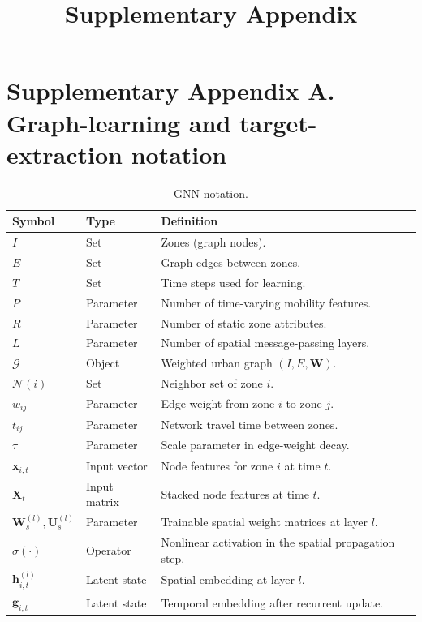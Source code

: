 \documentclass[11pt]{article}
\title{Supplementary Appendix}
\author{}
\date{}
\begin{document}
\maketitle

\section*{Supplementary Appendix A. Graph-learning and target-extraction notation}

\begin{table}[p]
\centering
\caption{GNN notation.}
\begin{threeparttable}
\scriptsize
\setlength{\tabcolsep}{3pt}
\renewcommand{\arraystretch}{0.97}
\begin{tabularx}{\textwidth}{Z Z Y}
\toprule
Symbol & Type & Definition \\
\midrule
$I$ & Set & Zones (graph nodes). \\
$E$ & Set & Graph edges between zones. \\
$T$ & Set & Time steps used for learning. \\
$P$ & Parameter & Number of time-varying mobility features. \\
$R$ & Parameter & Number of static zone attributes. \\
$L$ & Parameter & Number of spatial message-passing layers. \\
$\mathcal{G}$ & Object & Weighted urban graph $(I,E,\mathbf{W})$. \\
$\mathcal{N}(i)$ & Set & Neighbor set of zone $i$. \\
$w_{ij}$ & Parameter & Edge weight from zone $i$ to zone $j$. \\
$t_{ij}$ & Parameter & Network travel time between zones. \\
$\tau$ & Parameter & Scale parameter in edge-weight decay. \\
$\mathbf{x}_{i,t}$ & Input vector & Node features for zone $i$ at time $t$. \\
$\mathbf{X}_t$ & Input matrix & Stacked node features at time $t$. \\
$\mathbf{W}_s^{(l)},\mathbf{U}_s^{(l)}$ & Parameter & Trainable spatial weight matrices at layer $l$. \\
$\sigma(\cdot)$ & Operator & Nonlinear activation in the spatial propagation step. \\
$\mathbf{h}_{i,t}^{(l)}$ & Latent state & Spatial embedding at layer $l$. \\
$\mathbf{g}_{i,t}$ & Latent state & Temporal embedding after recurrent update. \\

\end{tabularx}
\end{threeparttable}
\end{table}
\end{document}
